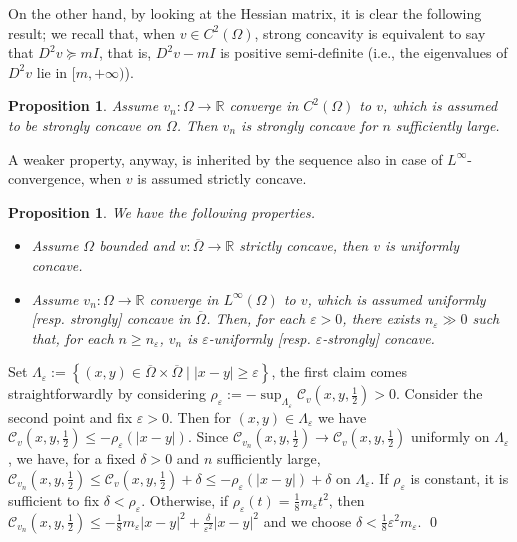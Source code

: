 \documentclass[11pt, reqno]{amsart}
\newtheorem{proposition}[lemma]{Proposition}
\theoremstyle{definition}
\numberwithin{equation}{section}
\newcommand{\R}{\mathbb{R}}
\newcommand{\mc}[1]{\mathcal{#1}}
\def\eps{\varepsilon}
\renewenvironment{proof}[1][\proofname]{\medskip \noindent {\bfseries #1. }}{\qed \bigskip}
\begin{document}
On the other hand, by looking at the Hessian matrix, it is clear the following result; we recall that, when $v \in C^2(\Omega)$, strong concavity is equivalent to say that $D^2 v \succcurlyeq m I$, that is, $D^2 v - m I$ is positive semi-definite (i.e., the eigenvalues of $D^2v$ lie in $[m,+\infty)$).

\begin{proposition}
\label{prop_strong_conc}
Assume $v_n : \Omega \to \R$ converge in $C^2(\Omega)$ to $v$, which is assumed to be strongly concave on $\Omega$. 
Then $v_n$ is strongly concave for $n$ sufficiently large. 
\end{proposition}

A weaker property, anyway, is inherited by the sequence also in case of $L^{\infty}$-convergence, when $v$ is assumed strictly concave.

\begin{proposition}
\label{prop_eps_strong_conc}
We have the following properties.
\begin{itemize}
\item Assume $\Omega$ bounded and $v: \overline{\Omega} \to \R$ strictly concave, then $v$ is uniformly concave. 
\item Assume $v_n : \Omega \to \R$ converge in $L^{\infty}(\Omega)$ to $v$, which is assumed uniformly [resp. strongly] concave in $\overline{\Omega}$. Then, for each $\eps>0$, there exists $n_{\eps}\gg 0$ such that, for each $n\geq n_{\eps}$, $v_n$ is $\eps$-uniformly [resp. $\eps$-strongly] concave.
\end{itemize}
\end{proposition}

\begin{proof}
Set $\Lambda_{\eps}:= \left\{(x,y) \in \overline{\Omega}\times\overline{\Omega} \mid |x-y| \geq \eps \right\}$, the first claim comes straightforwardly by considering $\rho_{\eps}:=- \sup_{\Lambda_{\eps}} \mc{C}_v(x,y,\frac{1}{2})>0$.
Consider the second point and fix $\eps>0$. Then for $(x,y) \in \Lambda_{\eps}$ we have $\mc{C}_v(x,y,\frac{1}{2}) \leq -\rho_{\eps}(|x-y|)$.
Since $\mc{C}_{v_n}\left(x,y,\tfrac{1}{2}\right) \to \mc{C}_v\left(x,y,\tfrac{1}{2}\right) $ uniformly on $\Lambda_{\eps}$, we have, for a fixed $\delta>0$ and $n$ sufficiently large, $\mc{C}_{v_n}\left(x,y,\tfrac{1}{2}\right) \leq \mc{C}_v\left(x,y,\tfrac{1}{2}\right) + \delta \leq -\rho_{\eps}(|x-y|) + \delta$ on $\Lambda_{\eps}$. 
If $\rho_{\eps}$ is constant, it is sufficient to fix $\delta < \rho_{\eps}$. 
Otherwise, if $\rho_{\eps}(t)=\frac{1}{8}m_{\eps} t^2$, then $\mc{C}_{v_n}\left(x,y,\tfrac{1}{2}\right) \leq -\frac{1}{8}m_{\eps} |x-y|^2+\frac{\delta}{\eps^2} |x-y|^2$ and we choose $\delta < \frac{1}{8} \eps^2 m_{\eps}.$
\end{proof}
\end{document}
